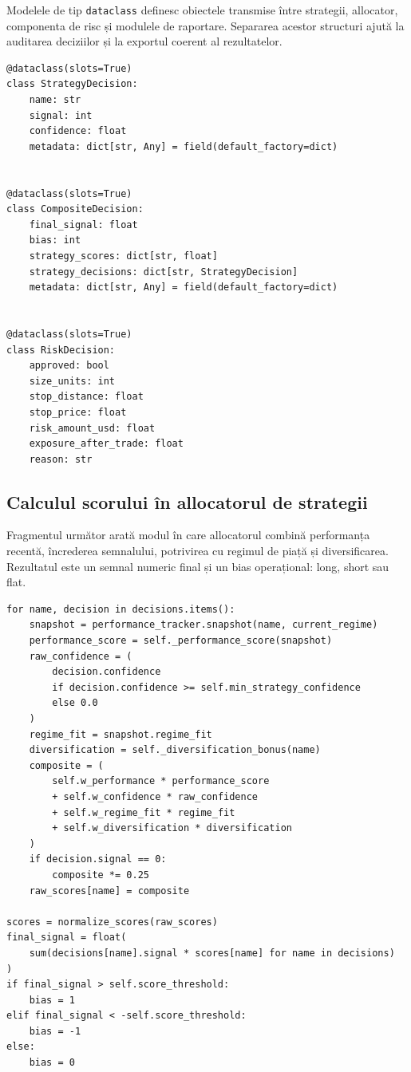 Modelele de tip \texttt{dataclass} definesc obiectele transmise între strategii, allocator, componenta de risc și modulele de raportare. Separarea acestor structuri ajută la auditarea deciziilor și la exportul coerent al rezultatelor.

\begin{code}
\begin{verbatim}
@dataclass(slots=True)
class StrategyDecision:
    name: str
    signal: int
    confidence: float
    metadata: dict[str, Any] = field(default_factory=dict)


@dataclass(slots=True)
class CompositeDecision:
    final_signal: float
    bias: int
    strategy_scores: dict[str, float]
    strategy_decisions: dict[str, StrategyDecision]
    metadata: dict[str, Any] = field(default_factory=dict)


@dataclass(slots=True)
class RiskDecision:
    approved: bool
    size_units: int
    stop_distance: float
    stop_price: float
    risk_amount_usd: float
    exposure_after_trade: float
    reason: str
\end{verbatim}
\caption{Modele interne pentru semnale compuse și decizii de risc}
\label{code:anexa_modele_decizie}
\end{code}

\subsection{Calculul scorului în allocatorul de strategii}
\label{anexa:cod_allocator}

Fragmentul următor arată modul în care allocatorul combină performanța recentă, încrederea semnalului, potrivirea cu regimul de piață și diversificarea. Rezultatul este un semnal numeric final și un bias operațional: long, short sau flat.

\begin{code}
\begin{verbatim}
for name, decision in decisions.items():
    snapshot = performance_tracker.snapshot(name, current_regime)
    performance_score = self._performance_score(snapshot)
    raw_confidence = (
        decision.confidence
        if decision.confidence >= self.min_strategy_confidence
        else 0.0
    )
    regime_fit = snapshot.regime_fit
    diversification = self._diversification_bonus(name)
    composite = (
        self.w_performance * performance_score
        + self.w_confidence * raw_confidence
        + self.w_regime_fit * regime_fit
        + self.w_diversification * diversification
    )
    if decision.signal == 0:
        composite *= 0.25
    raw_scores[name] = composite

scores = normalize_scores(raw_scores)
final_signal = float(
    sum(decisions[name].signal * scores[name] for name in decisions)
)
if final_signal > self.score_threshold:
    bias = 1
elif final_signal < -self.score_threshold:
    bias = -1
else:
    bias = 0
\end{verbatim}
\caption{Agregarea scorurilor în allocatorul multi-strategie}
\label{code:anexa_allocator_scor}
\end{code}

